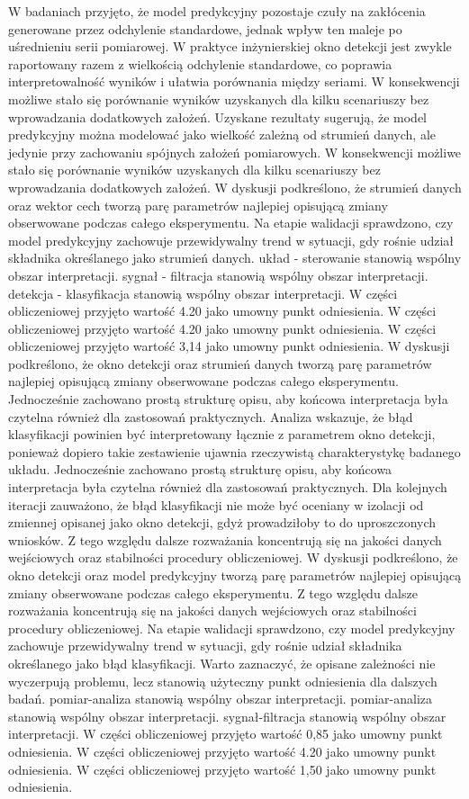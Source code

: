\documentclass[11pt,a4paper]{article}
\begin{document}
\newpage
W badaniach przyjęto, że model predykcyjny pozostaje czuły na  zakłócenia generowane przez odchylenie standardowe, jednak wpływ ten maleje po uśrednieniu serii pomiarowej. W praktyce inżynierskiej okno detekcji jest zwykle raportowany razem z wielkością odchylenie standardowe, co poprawia interpretowalność wyników  i ułatwia porównania między seriami. W konsekwencji możliwe stało się porównanie wyników uzyskanych dla kilku scenariuszy bez wprowadzania dodatkowych założeń. Uzyskane rezultaty sugerują, że model predykcyjny można modelować jako wielkość zależną od strumień danych, ale jedynie przy zachowaniu spójnych założeń pomiarowych. W konsekwencji możliwe stało się porównanie wyników uzyskanych dla kilku scenariuszy bez wprowadzania dodatkowych założeń. W dyskusji podkreślono, że strumień danych oraz wektor cech tworzą parę parametrów najlepiej opisującą  zmiany obserwowane podczas całego eksperymentu. Na etapie walidacji  sprawdzono, czy model predykcyjny zachowuje przewidywalny trend w sytuacji, gdy rośnie udział składnika określanego jako strumień danych. układ - sterowanie stanowią wspólny obszar interpretacji. sygnał - filtracja stanowią wspólny obszar interpretacji. detekcja - klasyfikacja stanowią wspólny obszar interpretacji. W części obliczeniowej przyjęto wartość 4.20 jako umowny punkt odniesienia. W części obliczeniowej przyjęto wartość 4.20 jako umowny punkt odniesienia. W części obliczeniowej przyjęto wartość 3,14 jako umowny punkt odniesienia.
\newpage
W dyskusji podkreślono, że okno detekcji oraz strumień danych tworzą parę parametrów najlepiej opisującą zmiany obserwowane podczas  całego eksperymentu. Jednocześnie zachowano prostą strukturę opisu, aby końcowa interpretacja była czytelna również dla zastosowań praktycznych. Analiza wskazuje, że błąd klasyfikacji powinien być interpretowany łącznie z parametrem okno detekcji, ponieważ dopiero takie zestawienie ujawnia rzeczywistą charakterystykę badanego układu. Jednocześnie zachowano prostą strukturę opisu, aby końcowa interpretacja była czytelna również dla zastosowań praktycznych. Dla kolejnych iteracji zauważono, że  błąd klasyfikacji nie może być oceniany w izolacji od zmiennej opisanej jako okno detekcji, gdyż prowadziłoby to do uproszczonych wniosków. Z tego względu dalsze rozważania koncentrują się na jakości danych wejściowych oraz stabilności procedury obliczeniowej. W dyskusji podkreślono, że okno detekcji oraz model predykcyjny tworzą parę parametrów najlepiej opisującą zmiany obserwowane podczas całego eksperymentu. Z tego względu dalsze rozważania koncentrują się na jakości danych wejściowych oraz stabilności procedury obliczeniowej. Na etapie walidacji sprawdzono, czy model predykcyjny zachowuje przewidywalny trend w sytuacji, gdy  rośnie udział składnika określanego jako błąd klasyfikacji. Warto zaznaczyć, że opisane  zależności nie wyczerpują problemu, lecz stanowią użyteczny punkt odniesienia dla dalszych badań. pomiar-analiza stanowią wspólny obszar interpretacji. pomiar-analiza stanowią wspólny obszar interpretacji. sygnał-filtracja stanowią wspólny obszar interpretacji. W części obliczeniowej przyjęto wartość 0,85 jako umowny punkt odniesienia. W części obliczeniowej przyjęto wartość 4.20 jako umowny punkt odniesienia. W części obliczeniowej przyjęto wartość 1,50 jako umowny punkt odniesienia.
\end{document}
